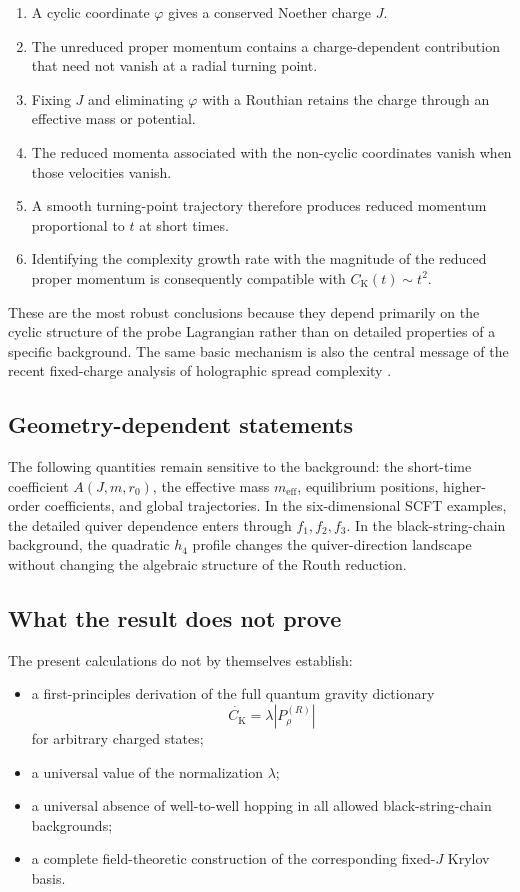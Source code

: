 \documentclass[11pt,a4paper]{article}
\theoremstyle{plain}
\theoremstyle{definition}
\theoremstyle{remark}
\newcommand{\PrhoR}{P_\rho^{(R)}}
\newcommand{\Ck}{C_{\mathrm K}}
\newcommand{\meff}{m_{\mathrm{eff}}}
\begin{document}
\begin{enumerate}[leftmargin=2em]
\item A cyclic coordinate $\varphi$ gives a conserved Noether charge $J$.
\item The unreduced proper momentum contains a charge-dependent contribution that need not vanish at a radial turning point.
\item Fixing $J$ and eliminating $\varphi$ with a Routhian retains the charge through an effective mass or potential.
\item The reduced momenta associated with the non-cyclic coordinates vanish when those velocities vanish.
\item A smooth turning-point trajectory therefore produces reduced momentum proportional to $t$ at short times.
\item Identifying the complexity growth rate with the magnitude of the reduced proper momentum is consequently compatible with $\Ck(t)\sim t^2$.
\end{enumerate}

These are the most robust conclusions because they depend primarily on the cyclic structure of the probe Lagrangian rather than on detailed properties of a specific background. The same basic mechanism is also the central message of the recent fixed-charge analysis of holographic spread complexity \cite{Chatzis:2026ekd}.

\subsection{Geometry-dependent statements}

The following quantities remain sensitive to the background: the short-time coefficient $A(J,m,r_0)$, the effective mass $\meff$, equilibrium positions, higher-order coefficients, and global trajectories. In the six-dimensional SCFT examples, the detailed quiver dependence enters through $f_1,f_2,f_3$. In the black-string-chain background, the quadratic $h_4$ profile changes the quiver-direction landscape without changing the algebraic structure of the Routh reduction.

\subsection{What the result does not prove}

The present calculations do not by themselves establish:
\begin{itemize}[leftmargin=2em]
\item a first-principles derivation of the full quantum gravity dictionary
\begin{equation*}
\dot{\Ck}=\lambda|\PrhoR|
\end{equation*}
for arbitrary charged states;
\item a universal value of the normalization $\lambda$;
\item a universal absence of well-to-well hopping in all allowed black-string-chain backgrounds;
\item a complete field-theoretic construction of the corresponding fixed-$J$ Krylov basis.
\end{itemize}
\end{document}
